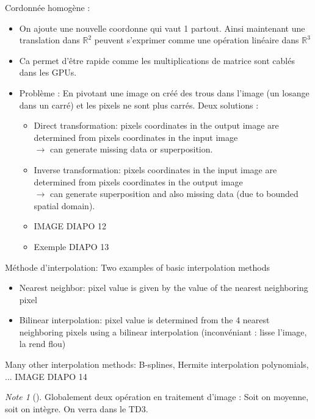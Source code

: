 \documentclass{article}
\theoremstyle{plain}%
\theoremstyle{definition}
\theoremstyle{remark}
\newtheorem*{note}{Note}
\begin{document}
Cordonnée homogène : \begin{itemize}
    \item On ajoute une nouvelle coordonne qui vaut 1 partout. Ainsi maintenant une translation dans $ \mathbb{R}^2 $ peuvent s'exprimer comme une opération linéaire dans $ \mathbb{R}^3 $ 
    \item Ca permet d'être rapide comme les multiplications de matrice sont cablés dans les GPUs. 
    \item Problème : En pivotant une image on créé des trous dans l'image (un losange dans un carré) et les pixels ne sont plus carrés. Deux solutions : \begin{itemize}
        \item Direct transformation: pixels coordinates in the output image are determined from pixels coordinates in the input image \\
        $\rightarrow$ can generate missing data or superposition.
        \item Inverse transformation: pixels coordinates in the input image are determined from pixels coordinates in the output image \\
        $\rightarrow$ can generate superposition and also missing data (due to bounded spatial domain).
        \item IMAGE DIAPO 12
        \item Exemple DIAPO 13
    \end{itemize}
\end{itemize}

Méthode d'interpolation: 
Two examples of basic interpolation methods
\begin{itemize}
    \item Nearest neighbor: pixel value is given by the value of the nearest neighboring pixel
    \item Bilinear interpolation: pixel value is determined from the 4 nearest neighboring pixels using a bilinear interpolation (inconvéniant : lisse l'image, la rend flou)
\end{itemize}
Many other interpolation methods: B-splines, Hermite interpolation polynomials, ...
IMAGE DIAPO 14
\begin{note}[]
    Globalement deux opération en traitement d'image : Soit on moyenne, soit on intègre. On verra dans le TD3.
\end{note}
\end{document}
